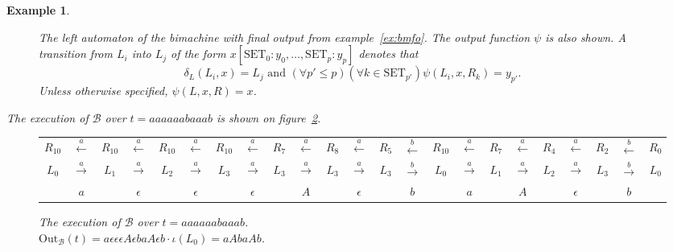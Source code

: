 \documentclass{article}
\newtheorem{example}[definition]{Example}
\begin{document}
\begin{example}
\begin{figure}
\begin{center}
			\end{center}
			\caption{The left automaton of the bimachine with final output from example~\ref{ex:bmfo}. The output function $\psi$ is also shown. A transition from $L_i$ into $L_j$ of the form $x[\mathrm{SET}_0{:}y_0, \ldots, \mathrm{SET}_p{:}y_p]$ denotes that
			\[ \delta_L(L_i, x)=L_j \text{ and } (\forall p'\le p)(\forall k\in \mathrm{SET}_{p'})\psi(L_i, x, R_k)=y_{p'}. \]
			Unless otherwise specified, $\psi(L, x, R)=x$.}
			\label{fig:ex:bmfo:A_L}
		\end{figure}
		
		The execution of $\mathcal{B}$ over $t=aaaaaabaaab$ is shown on figure~\ref{fig:ex:bmfo:execution}.
		\begin{figure}[h]
			\begin{adjustbox}{center=\textwidth}
				\setlength\tabcolsep{3pt} %
				\begin{tabular}{*{23}{c}}
					${R_{10}}$ &$\xleftarrow{a}$& ${R_{10}}$ &$\xleftarrow{a}$& ${R_{10}}$ &$\xleftarrow{a}$& ${R_{10}}$ &$\xleftarrow{a}$& ${R_7}$ &$\xleftarrow{a}$& ${R_8}$
					&$\xleftarrow{a}$& ${R_5}$ &$\xleftarrow{b}$& ${R_{10}}$ &$\xleftarrow{a}$& ${R_7}$ &$\xleftarrow{a}$& $R_4$ &$\xleftarrow{a}$& ${R_2}$
					&$\xleftarrow{b}$& $R_0$ \\
					$L_0$ &$\xrightarrow{a}$& ${L_1}$ &$\xrightarrow{a}$& ${L_2}$ &$\xrightarrow{a}$& ${L_3}$ &$\xrightarrow{a}$& ${L_3}$ &$\xrightarrow{a}$& ${L_3}$
					&$\xrightarrow{a}$& ${L_3}$ &$\xrightarrow{b}$& $L_0$ &$\xrightarrow{a}$& ${L_1}$ &$\xrightarrow{a}$& ${L_2}$ &$\xrightarrow{a}$& ${L_3}$
					&$\xrightarrow{b}$& $L_0$ \\
					& $a$ && $\epsilon$ && $\epsilon$ && $\epsilon$ && $A$ && $\epsilon$ && $b$ && $a$ && $A$ && $\epsilon$ && $b$ & \\
				\end{tabular}
			\end{adjustbox}
			\caption{The execution of $\mathcal{B}$ over $t=aaaaaabaaab$. \\
				$\mathrm{Out}_\mathcal{B}(t) = a\epsilon\epsilon\epsilon A\epsilon baA\epsilon b\cdot\iota(L_0) = aAbaAb$.}
			\label{fig:ex:bmfo:execution}
		\end{figure}
	\end{example}
	
\end{document}
